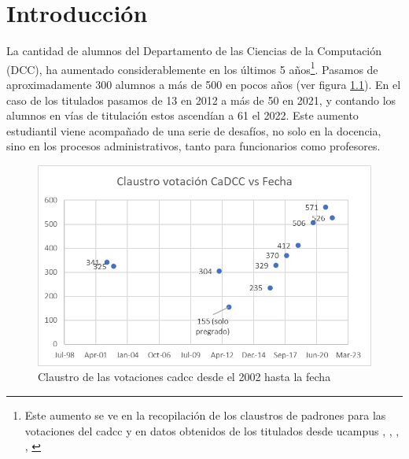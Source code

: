 \chapter{Introducción}\label{chap:intro}

    \par  La cantidad de alumnos del Departamento de las Ciencias de la Computación (DCC), ha aumentado considerablemente en los últimos 5 años\footnote{Este aumento se ve en la recopilación de los claustros de padrones para las votaciones del \acrshort{cadcc} y en datos obtenidos de los titulados desde ucampus \cite{CADCC2002}, \cite{CADCC2016}, \cite{CADCC2018}, \cite{CADCC2021}, \cite{CADCC2022}}. Pasamos de aproximadamente 300 alumnos a más de 500 en pocos años (ver figura \ref{fig:aumento_alumnos}). En el caso de los titulados pasamos de 13 en 2012 a más de 50 en 2021, y contando los alumnos en vías de titulación estos ascendían a 61 el 2022. Este aumento estudiantil viene acompañado de una serie de desafíos, no solo en la docencia, sino en los procesos administrativos, tanto para funcionarios como profesores.

    \begin{figure}[h]
        \centering
        \includegraphics[scale=0.6]{media/imagenes/claustro_votacion_cadcc.jpg}
        \caption[Claustro votaciones \acrshort{cadcc}]{Claustro de las votaciones cadcc desde el 2002 hasta la fecha}
        \label{fig:aumento_alumnos}
    \end{figure}


